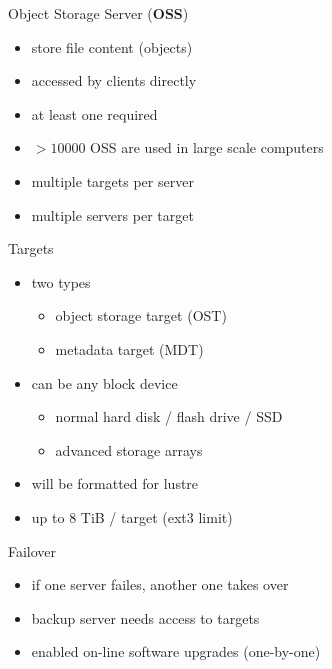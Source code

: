 
\begin{frame}{Object Storage Server (\textbf{OSS})}
    \begin{itemize}
        \item store file content (objects)
        \item accessed by clients directly
        \item at least one required
        \item $>10000$ OSS are used in large scale computers
        \item multiple targets per server
        \item multiple servers per target
    \end{itemize}
\end{frame}


\begin{frame}{Targets}
    \begin{itemize}
        \item two types
            \begin{itemize}
                \item object storage target (OST)
                \item metadata target (MDT)
            \end{itemize}
        \item can be any block device
            \begin{itemize}
                \item normal hard disk / flash drive / SSD
                \item advanced storage arrays
            \end{itemize}
        \item will be formatted for lustre
        \item up to 8 TiB / target (ext3 limit)
    \end{itemize}
\end{frame}

\begin{frame}{Failover}
    \begin{itemize}
        \item if one server failes, another one takes over
        \item backup server needs access to targets
        \item enabled on-line software upgrades (one-by-one)
    \end{itemize}
\end{frame}

